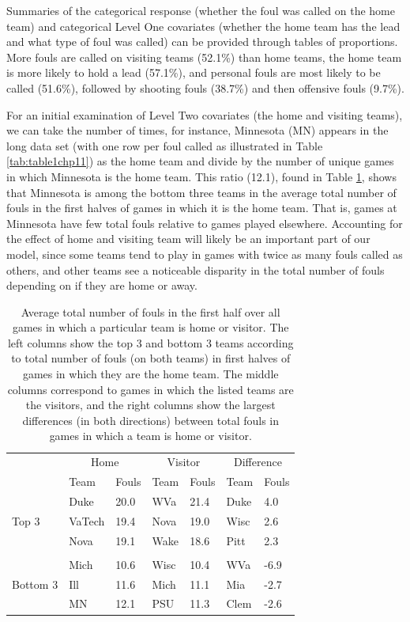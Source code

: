 \documentclass[
]{krantz}
\begin{document}
Summaries of the categorical response (whether the foul was called on the home team) and categorical Level One covariates (whether the home team has the lead and what type of foul was called) can be provided through tables of proportions. More fouls are called on visiting teams (52.1\%) than home teams, the home team is more likely to hold a lead (57.1\%), and personal fouls are most likely to be called (51.6\%), followed by shooting fouls (38.7\%) and then offensive fouls (9.7\%).

For an initial examination of Level Two covariates (the home and visiting teams), we can take the number of times, for instance, Minnesota (MN) appears in the long data set (with one row per foul called as illustrated in Table \ref{tab:table1chp11}) as the home team and divide by the number of unique games in which Minnesota is the home team. This ratio (12.1), found in Table \ref{tab:table2chp11}, shows that Minnesota is among the bottom three teams in the average total number of fouls in the first halves of games in which it is the home team. That is, games at Minnesota have few total fouls relative to games played elsewhere. Accounting for the effect of home and visiting team will likely be an important part of our model, since some teams tend to play in games with twice as many fouls called as others, and other teams see a noticeable disparity in the total number of fouls depending on if they are home or away.

\begin{table}

\caption{\label{tab:table2chp11} Average total number of fouls in the first half over all games in which a particular team is home or visitor.  The left columns show the top 3 and bottom 3 teams according to total number of fouls (on both teams) in first halves of games in which they are the home team.  The middle columns correspond to games in which the listed teams are the visitors, and the right columns show the largest differences (in both directions) between total fouls in games in which a team is home or visitor.}
\centering
\begin{tabular}[t]{lllllll}
\toprule
\multicolumn{1}{c}{ } & \multicolumn{2}{c}{Home} & \multicolumn{2}{c}{Visitor} & \multicolumn{2}{c}{Difference} \\
\cmidrule(l{3pt}r{3pt}){2-3} \cmidrule(l{3pt}r{3pt}){4-5} \cmidrule(l{3pt}r{3pt}){6-7}
  & Team & Fouls & Team & Fouls & Team & Fouls\\
\midrule
 & Duke & 20.0 & WVa & 21.4 & Duke & 4.0\\
Top 3 & VaTech & 19.4 & Nova & 19.0 & Wisc & 2.6\\
 & Nova & 19.1 & Wake & 18.6 & Pitt & 2.3\\
 &  &  &  &  &  & \\
 & Mich & 10.6 & Wisc & 10.4 & WVa & -6.9\\
\addlinespace
Bottom 3 & Ill & 11.6 & Mich & 11.1 & Mia & -2.7\\
 & MN & 12.1 & PSU & 11.3 & Clem & -2.6\\
\bottomrule
\end{tabular}
\end{table}
\end{document}
